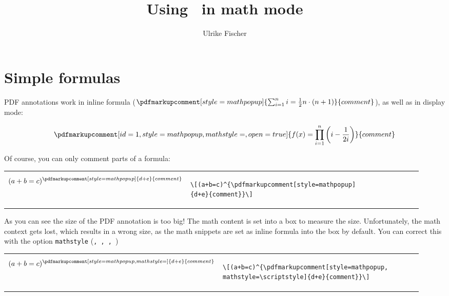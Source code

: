 \documentclass{article}
\author{Ulrike Fischer}
\title{Using \texttt{\string\pdfmarkupcomment}\ in math mode}
\begin{document}


\maketitle
\section{Simple formulas}
PDF annotations work in inline formula ($\pdfmarkupcomment[style=mathpopup]{\sum_{i=1}^{n}i=\frac{1}{2}n\cdot(n+1)}{comment}$), as well as in display mode:

\[\pdfmarkupcomment[id=1,style=mathpopup,mathstyle=\displaystyle,open=true]{f(x)=\prod_{i=1}^{n}\left(i-\frac{1}{2i}\right)}{comment}\]

\bigskip
Of course, you can only comment parts of a formula:

\bigskip
\begin{tabular}{p{0.26\linewidth}p{0.68\linewidth}}
\[(a+b=c)^{\pdfmarkupcomment[style=mathpopup]{d+e}{comment}}\]
&
\begin{verbatim}
\[(a+b=c)^{\pdfmarkupcomment[style=mathpopup]
{d+e}{comment}}\]
\end{verbatim}
\end{tabular}

\bigskip
As you can see the size of the PDF annotation is too big! The math content is set into a box to measure the size. Unfortunately, the math context gets lost, which results in a wrong size, as the math snippets are set as inline formula into the box by default. You can correct this with the option \texttt{mathstyle} (\texttt{\string\textstyle, \string\displaystyle, \string\scriptstyle, \string\scriptscriptstyle})

\bigskip
\begin{tabular}{p{0.26\linewidth}p{0.68\linewidth}}
\[(a+b=c)^{\pdfmarkupcomment[style=mathpopup,mathstyle=\scriptstyle]{d+e}{comment}}\]
&
\begin{verbatim}
\[(a+b=c)^{\pdfmarkupcomment[style=mathpopup,
mathstyle=\scriptstyle]{d+e}{comment}}\]
\end{verbatim}
\end{tabular}
\end{document}
